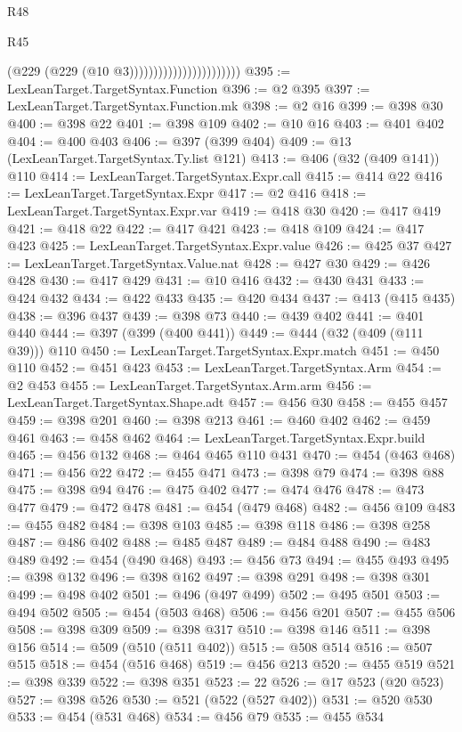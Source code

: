 \begin{lexlean}{R48}
\begin{lexlean}{R45}
\begin{coremodule}
{{{{{{{{{{{{{{{{{{{{{{{{{{{{{{{{{{{{{{{{{{{{{{{{{{{{{{{{{{{{{{{{{{{{{{{{{{{{{{{{{{{{{{{{{{{                                            (@229 (@229 (@10 @3)))))))))))))))))))))))
@395 := LexLeanTarget.TargetSyntax.Function
@396 := @2 @395
@397 := LexLeanTarget.TargetSyntax.Function.mk
@398 := @2 @16
@399 := @398 @30
@400 := @398 @22
@401 := @398 @109
@402 := @10 @16
@403 := @401 @402
@404 := @400 @403
@406 := @397 (@399 @404)
@409 := @13 (LexLeanTarget.TargetSyntax.Ty.list @121)
@413 := @406 (@32 (@409 @141)) @110
@414 := LexLeanTarget.TargetSyntax.Expr.call
@415 := @414 @22
@416 := LexLeanTarget.TargetSyntax.Expr
@417 := @2 @416
@418 := LexLeanTarget.TargetSyntax.Expr.var
@419 := @418 @30
@420 := @417 @419
@421 := @418 @22
@422 := @417 @421
@423 := @418 @109
@424 := @417 @423
@425 := LexLeanTarget.TargetSyntax.Expr.value
@426 := @425 @37
@427 := LexLeanTarget.TargetSyntax.Value.nat
@428 := @427 @30
@429 := @426 @428
@430 := @417 @429
@431 := @10 @416
@432 := @430 @431
@433 := @424 @432
@434 := @422 @433
@435 := @420 @434
@437 := @413 (@415 @435)
@438 := @396 @437
@439 := @398 @73
@440 := @439 @402
@441 := @401 @440
@444 := @397 (@399 (@400 @441))
@449 := @444 (@32 (@409 (@111 @39))) @110
@450 := LexLeanTarget.TargetSyntax.Expr.match
@451 := @450 @110
@452 := @451 @423
@453 := LexLeanTarget.TargetSyntax.Arm
@454 := @2 @453
@455 := LexLeanTarget.TargetSyntax.Arm.arm
@456 := LexLeanTarget.TargetSyntax.Shape.adt
@457 := @456 @30
@458 := @455 @457
@459 := @398 @201
@460 := @398 @213
@461 := @460 @402
@462 := @459 @461
@463 := @458 @462
@464 := LexLeanTarget.TargetSyntax.Expr.build
@465 := @456 @132
@468 := @464 @465 @110 @431
@470 := @454 (@463 @468)
@471 := @456 @22
@472 := @455 @471
@473 := @398 @79
@474 := @398 @88
@475 := @398 @94
@476 := @475 @402
@477 := @474 @476
@478 := @473 @477
@479 := @472 @478
@481 := @454 (@479 @468)
@482 := @456 @109
@483 := @455 @482
@484 := @398 @103
@485 := @398 @118
@486 := @398 @258
@487 := @486 @402
@488 := @485 @487
@489 := @484 @488
@490 := @483 @489
@492 := @454 (@490 @468)
@493 := @456 @73
@494 := @455 @493
@495 := @398 @132
@496 := @398 @162
@497 := @398 @291
@498 := @398 @301
@499 := @498 @402
@501 := @496 (@497 @499)
@502 := @495 @501
@503 := @494 @502
@505 := @454 (@503 @468)
@506 := @456 @201
@507 := @455 @506
@508 := @398 @309
@509 := @398 @317
@510 := @398 @146
@511 := @398 @156
@514 := @509 (@510 (@511 @402))
@515 := @508 @514
@516 := @507 @515
@518 := @454 (@516 @468)
@519 := @456 @213
@520 := @455 @519
@521 := @398 @339
@522 := @398 @351
@523 := 22
@526 := @17 @523 (@20 @523)
@527 := @398 @526
@530 := @521 (@522 (@527 @402))
@531 := @520 @530
@533 := @454 (@531 @468)
@534 := @456 @79
@535 := @455 @534
}}}}}}}}}}}}}}}}}}}}}}}}}}}}}}}}}}}}}}}}}}}}}}}}}}}}}}}}}}}}}}}}}}}}}}}}}}}}}}}}}}}}}}}}}}}
\end{coremodule}
\end{lexlean}
\end{lexlean}
